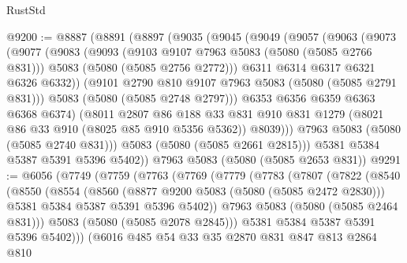 \begin{lexlean}{RustStd}
\begin{coremodule}
@9200 := @8887
    (@8891
      (@8897
        (@9035
          (@9045
            (@9049
              (@9057
                (@9063
                  (@9073
                    (@9077
                      (@9083
                        (@9093
                          (@9103 @9107 @7963 @5083 (@5080 (@5085 @2766 @831)))
                          @5083
                          (@5080 (@5085 @2756 @2772)))
                        @6311
                        @6314
                        @6317
                        @6321
                        @6326
                        @6332))
                    (@9101 @2790 @810 @9107 @7963 @5083 (@5080 (@5085 @2791 @831)))
                    @5083
                    (@5080 (@5085 @2748 @2797)))
                  @6353
                  @6356
                  @6359
                  @6363
                  @6368
                  @6374)
                (@8011
                  @2807
                  @86
                  @188
                  @33
                  @831
                  @910
                  @831
                  @1279
                  (@8021 @86 @33 @910 (@8025 @85 @910 @5356 @5362))
                  @8039)))
            @7963
            @5083
            (@5080 (@5085 @2740 @831)))
          @5083
          (@5080 (@5085 @2661 @2815)))
        @5381
        @5384
        @5387
        @5391
        @5396
        @5402))
    @7963
    @5083
    (@5080 (@5085 @2653 @831))
@9291 := @6056
    (@7749
      (@7759
        (@7763
          (@7769
            (@7779
              (@7783
                (@7807
                  (@7822
                    (@8540
                      (@8550
                        (@8554
                          (@8560
                            (@8877 @9200 @5083 (@5080 (@5085 @2472 @2830)))
                            @5381
                            @5384
                            @5387
                            @5391
                            @5396
                            @5402))
                        @7963
                        @5083
                        (@5080 (@5085 @2464 @831)))
                      @5083
                      (@5080 (@5085 @2078 @2845)))
                    @5381
                    @5384
                    @5387
                    @5391
                    @5396
                    @5402)))
              (@6016
                @485
                @54
                @33
                @35
                @2870
                @831
                @847
                @813
                @2864
                @810

\end{coremodule}
\end{lexlean}
